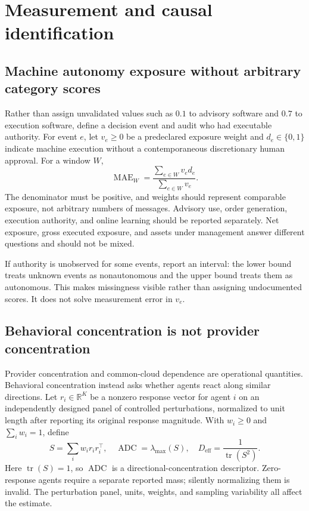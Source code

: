 \documentclass[11pt,a4paper]{article}
\theoremstyle{definition}
\theoremstyle{remark}
\newcommand{\R}{\mathbb{R}}
\newcommand{\tr}{\operatorname{tr}}
\newcommand{\MAE}{\operatorname{MAE}}
\newcommand{\ADC}{\operatorname{ADC}}
\begin{document}
\section{Measurement and causal identification}
\label{sec:measurement}
\subsection{Machine autonomy exposure without arbitrary category scores}
Rather than assign unvalidated values such as $0.1$ to advisory software and $0.7$ to execution software, define a decision event and audit who had executable authority. For event $e$, let $v_e\geq0$ be a predeclared exposure weight and $d_e\in\{0,1\}$ indicate machine execution without a contemporaneous discretionary human approval. For a window $W$,
\begin{equation}
 \MAE_W=\frac{\sum_{e\in W}v_e d_e}{\sum_{e\in W}v_e}.
 \label{eq:mae}
\end{equation}
The denominator must be positive, and weights should represent comparable exposure, not arbitrary numbers of messages. Advisory use, order generation, execution authority, and online learning should be reported separately. Net exposure, gross executed exposure, and assets under management answer different questions and should not be mixed.

If authority is unobserved for some events, report an interval: the lower bound treats unknown events as nonautonomous and the upper bound treats them as autonomous. This makes missingness visible rather than assigning undocumented scores. It does not solve measurement error in $v_e$.

\subsection{Behavioral concentration is not provider concentration}
Provider concentration and common-cloud dependence are operational quantities. Behavioral concentration instead asks whether agents react along similar directions. Let $r_i\in\R^K$ be a nonzero response vector for agent $i$ on an independently designed panel of controlled perturbations, normalized to unit length after reporting its original response magnitude. With $w_i\geq0$ and $\sum_iw_i=1$, define
\begin{equation}
 S=\sum_i w_i r_i r_i^\top,\quad
 \ADC=\lambda_{\max}(S),\quad
 D_{\mathrm{eff}}=\frac{1}{\tr(S^2)}.
 \label{eq:adc}
\end{equation}
Here $\tr(S)=1$, so $\ADC$ is a directional-concentration descriptor. Zero-response agents require a separate reported mass; silently normalizing them is invalid. The perturbation panel, units, weights, and sampling variability all affect the estimate.
\end{document}
